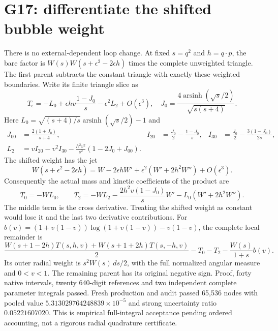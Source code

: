 \documentclass[11pt]{article}
\begin{document}
\section*{G17: differentiate the shifted bubble weight}
There is no external-dependent loop change. At fixed $s=q^2$ and
$h=q\cdot p$, the bare factor is $W(s)W(s+\epsilon^2-2\epsilon h)$
times the complete unweighted triangle. The first parent subtracts
the constant triangle with exactly these weighted boundaries.
Write its finite triangle slice as
\[
 T_\epsilon=-L_0+\epsilon h v\frac{1-J_0}{s}
                    -\epsilon^2L_2+O(\epsilon^3),
 \quad J_0=\frac{4\operatorname{arsinh}(\sqrt s/2)}{\sqrt{s(s+4)}}.
\]
Here $L_0=\sqrt{(s+4)/s}\operatorname{arsinh}(\sqrt s/2)-1$ and
\begin{align*}
 J_{00}&=\frac{2(1+J_0)}{s+4},&
 I_{20}&=\frac{J_0}{2}-\frac{1-J_0}{s},&
 I_{30}&=\frac{J_0}{2}-\frac{3(1-J_0)}{2s},\\
 L_2&=v I_{20}-v^2 I_{30}
       -\frac{h^2v^2}{s^2}(1-2J_0+J_{00}).
\end{align*}
The shifted weight has the jet
\[
 W(s+\epsilon^2-2\epsilon h)
 =W-2\epsilon h W'+\epsilon^2(W'+2h^2W'')+O(\epsilon^3).
\]
Consequently the actual mass and kinetic coefficients of the product are
\[
 T_0=-WL_0,\qquad
 T_2=-WL_2-\frac{2h^2v(1-J_0)}sW'
                   -L_0(W'+2h^2W'').
\]
The middle term is the cross derivative. Treating the shifted weight as
constant would lose it and the last two derivative contributions.
For $b(v)=(1+v(1-v))\log(1+v(1-v))-v(1-v)$, the complete local remainder is
\[
 \frac{W(s+1-2h)T(s,h,v)+W(s+1+2h)T(s,-h,v)}2
 -T_0-T_2-\frac{W(s)}{1+s}b(v).
\]
Its outer radial weight is $s^2W(s)\,ds/2$, with the full normalized
angular measure and $0<v<1$. The remaining parent has its original
negative sign. Proof, forty native intervals, twenty 640-digit references
and two independent complete parameter integrals passed. Fresh production
and audit passed 65,536 nodes with pooled value
$5.313029764248839\times10^{-5}$ and strong uncertainty ratio
$0.05221607020$. This is empirical full-integral acceptance pending
ordered accounting, not a rigorous radial quadrature certificate.
\end{document}
